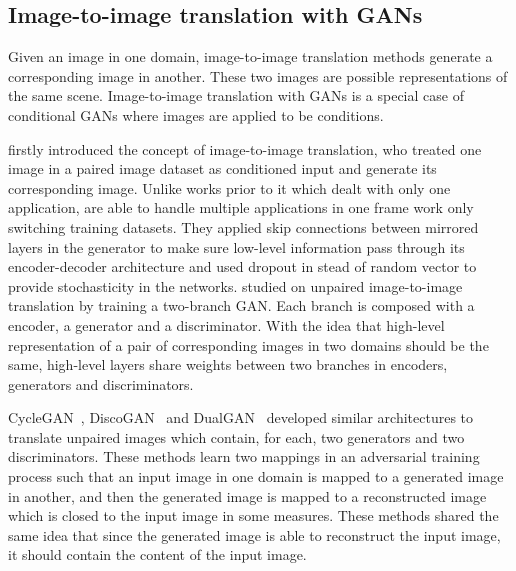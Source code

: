 \subsection{Image-to-image translation with GANs}
Given an image in one domain, image-to-image translation methods generate a corresponding image in another. These two images are possible representations of the same scene. Image-to-image translation with GANs is a special case of conditional GANs where images are applied to be conditions. 
%

\cite{pix2pix} firstly introduced the concept of image-to-image translation, who treated one image in a paired image dataset as conditioned input and generate its corresponding image. Unlike works prior to it which dealt with only one application, \cite{pix2pix} are able to handle multiple applications in one frame work only switching training datasets. They applied skip connections between mirrored layers in the generator to make sure low-level information pass through its encoder-decoder architecture and used dropout in stead of random vector to provide stochasticity in the networks.
%
\cite{UNIT} studied on unpaired image-to-image translation by training a two-branch GAN. Each branch is composed with a encoder, a generator and a discriminator. With the idea that high-level representation of a pair of corresponding images in two domains should be the same, high-level layers share weights between two branches in encoders, generators and discriminators. 
%

CycleGAN~\cite{CycleGAN}, DiscoGAN~\cite{DiscoGAN} and DualGAN~\cite{DualGAN} developed similar architectures to translate unpaired images which contain, for each, two generators and two discriminators. These methods learn two mappings in an adversarial training process such that an input image in one domain is mapped to a generated image in another, and then the generated image is mapped to a reconstructed image which is closed to the input image in some measures. These methods shared the same idea that since the generated image is able to reconstruct the input image, it should contain the content of the input image.